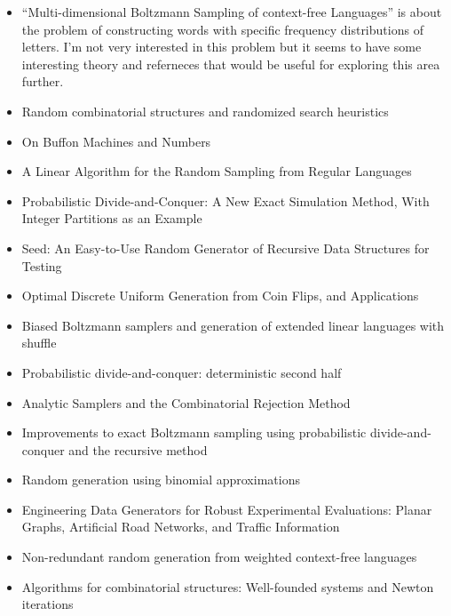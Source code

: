 \begin{itemize}
\item ``Multi-dimensional Boltzmann Sampling of context-free Languages''\cite{DBLP:journals/corr/abs-1002-0046} is about the problem of constructing words with specific frequency distributions of letters.
I'm not very interested in this problem but it seems to have some interesting theory and referneces that would be useful for exploring this area further.
\item Random combinatorial structures and randomized search heuristics\cite{DBLP:phd/de/Johannsen2010}
\item On Buffon Machines and Numbers\cite{DBLP:conf/soda/FlajoletPS11}
\item A Linear Algorithm for the Random Sampling from Regular Languages\cite{DBLP:journals/algorithmica/BernardiG12}
\item Probabilistic Divide-and-Conquer: A New Exact Simulation Method, With Integer Partitions as an Example\cite{DBLP:journals/cpc/ArratiaD16}
\item Seed: An Easy-to-Use Random Generator of Recursive Data Structures for Testing\cite{DBLP:conf/icst/HeamN11}
\item Optimal Discrete Uniform Generation from Coin Flips, and Applications\cite{DBLP:journals/corr/abs-1304-1916}
\item Biased Boltzmann samplers and generation of extended linear languages with shuffle\cite{darrasse2012biased}
\item Probabilistic divide-and-conquer: deterministic second half\cite{desalvo2014probabilistic}
\item Analytic Samplers and the Combinatorial Rejection Method\cite{DBLP:conf/analco/BodiniLR15}
\item Improvements to exact Boltzmann sampling using probabilistic divide-and-conquer and the recursive method\cite{DBLP:journals/endm/Desalvo17}
\item Random generation using binomial approximations\cite{gouyou2010random}
\item Engineering Data Generators for Robust Experimental Evaluations: Planar Graphs, Artificial Road Networks, and Traffic Information\cite{DBLP:phd/dnb/Meinert12}
\item Non-redundant random generation from weighted context-free languages\cite{DBLP:journals/corr/abs-1012-4560}
\item Algorithms for combinatorial structures: Well-founded systems and Newton iterations\cite{DBLP:journals/jct/PivoteauSS12}

\end{itemize}
